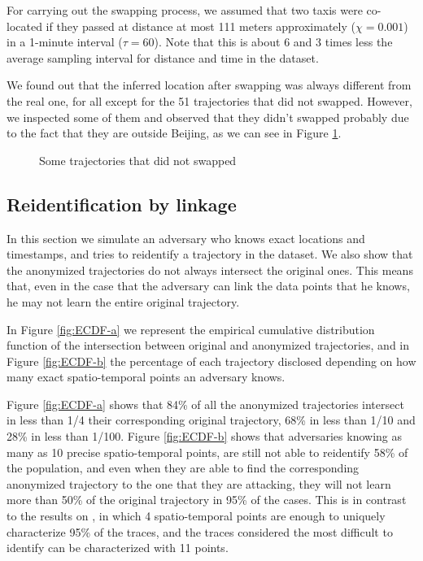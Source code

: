 \documentclass{llncs}
\begin{document}
For carrying out the swapping process, we assumed that two taxis were co-located if they passed at distance at most 111 meters approximately ($\chi= 0.001$) in a 1-minute interval ($\tau = 60$). Note that this is about 6 and 3 times less the average sampling interval for distance and time in the dataset.

We found out that the inferred location after swapping was always different from the real one, for all except for the 51 trajectories that did not swapped.
However, we inspected some of them and observed that they didn't swapped probably due to the fact that they are outside Beijing, as we can see in Figure \ref{fig:noSwap}.

\begin{figure}
  \caption{Some trajectories that did not swapped}
  \label{fig:noSwap}
\end{figure}

\subsection{Reidentification by linkage}

In this section we simulate an adversary who knows exact locations and timestamps, and tries to reidentify a trajectory in the dataset.
We also show that the anonymized trajectories do not always intersect the original ones. This means that, even in the case that the adversary can link the data points that he knows, he may not learn the entire original trajectory.

In Figure \ref{fig:ECDF-a} we represent the empirical cumulative distribution function of the intersection between original and anonymized trajectories, and in Figure \ref{fig:ECDF-b} the percentage of each trajectory disclosed depending on how many exact spatio-temporal points an adversary knows.

Figure \ref{fig:ECDF-a} shows that
84\% of all the anonymized trajectories intersect in less than 1/4 their corresponding original trajectory, 68\% in less than 1/10 and 28\% in less than 1/100.
Figure \ref{fig:ECDF-b} shows that adversaries knowing as many as 10 precise spatio-temporal points, are still not able to reidentify 58\% of the population, and even when they are able to find the corresponding anonymized trajectory to the one that they are attacking, they will not learn more than 50\% of the original trajectory in 95\% of the cases.
This is in contrast to the results on \cite{demontjoye2013}, in which 4 spatio-temporal points are enough to uniquely characterize 95\% of the traces, and the traces considered the most difficult to identify can be characterized with 11 points.
\end{document}
